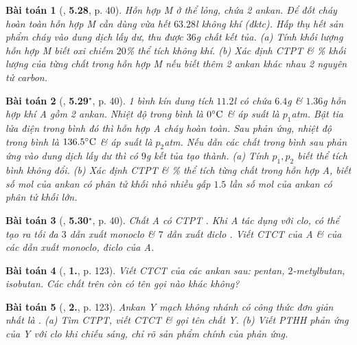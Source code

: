 \documentclass{article}
\numberwithin{equation}{section}
\newtheorem{baitoan}{Bài toán}[section]
\begin{document}
\begin{baitoan}[\cite{SBT_Hoa_Hoc_11_co_ban}, \textbf{5.28}, p. 40]
	Hỗn hợp M ở thể lỏng, chứa 2 ankan. Để đốt cháy hoàn toàn hỗn hợp M cần dùng vừa hết $63.28$\emph{l} không khí (đktc). Hấp thụ hết sản phẩm cháy vào dung dịch \emph{} lấy dư, thu được $36$\emph{g} chất kết tủa. (a) Tính khối lượng hỗn hợp M biết oxi chiếm $20$\% thể tích không khí. (b) Xác định CTPT \& \% khối lượng của từng chất trong hỗn hợp M nếu biết thêm 2 ankan khác nhau 2 nguyên tử carbon.
\end{baitoan}

\begin{baitoan}[\cite{SBT_Hoa_Hoc_11_co_ban}, \textbf{5.29}${}^\star$, p. 40]
	1 bình kín dung tích $11.2$\emph{l} có chứa $6.4$\emph{g} \emph{} \& $1.36$\emph{g} hỗn hợp khí A gồm 2 ankan. Nhiệt độ trong bình là $0^\circ{\rm C}$ \& áp suất là $p_1$\emph{atm}. Bật tia lửa điện trong bình đó thì hỗn hợp A cháy hoàn toàn. Sau phản ứng, nhiệt độ trong bình là $136.5^\circ{\rm C}$ \& áp suất là $p_2$\emph{atm}. Nếu dẫn các chất trong bình sau phản ứng vào dung dịch \emph{} lấy dư thì có $9$\emph{g} kết tủa tạo thành. (a) Tính $p_1,p_2$ biết thể tích bình không đổi. (b) Xác định CTPT \& \% thể tích từng chất trong hỗn hợp A, biết số mol của ankan có phân tử khối nhỏ nhiều gấp $1.5$ lần số mol của ankan có phân tử khối lớn.
\end{baitoan}

\begin{baitoan}[\cite{SBT_Hoa_Hoc_11_co_ban}, \textbf{5.30}${}^\star$, p. 40]
	Chất A có CTPT \emph{}. Khi A tác dụng với clo, có thể tạo ra tối đa $3$ dẫn xuất monoclo \emph{} \& $7$ dẫn xuất điclo \emph{}. Viết CTCT của A \& của các dẫn xuất monoclo, điclo của A.
\end{baitoan}

\begin{baitoan}[\cite{SGK_Hoa_Hoc_11_co_ban}, \textbf{1.}, p. 123]
	Viết CTCT của các ankan sau: pentan, $2$-metylbutan, isobutan. Các chất trên còn có tên gọi nào khác không?
\end{baitoan}

\begin{baitoan}[\cite{SGK_Hoa_Hoc_11_co_ban}, \textbf{2.}, p. 123]
	Ankan Y mạch không nhánh có công thức đơn giản nhất là \emph{}. (a) Tìm CTPT, viết CTCT \& gọi tên chất Y. (b) Viết PTHH phản ứng của Y với clo khi chiếu sáng, chỉ rõ sản phẩm chính của phản ứng.
\end{baitoan}
\end{document}
